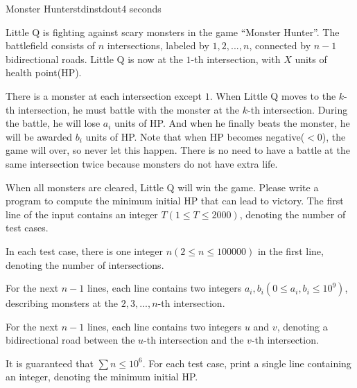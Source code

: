 \documentclass[11pt,a4paper,oneside]{article}
\newcommand{\timeLimit}{2 seconds}
\renewcommand{\defaultmemorylimit}{512 megabytes}
\begin{document}
\renewcommand{\timeLimit}{4 seconds}
\renewcommand{\defaultmemorylimit}{512 megabytes}
\begin{problem}{Monster Hunter}{stdin}{stdout}{\timeLimit}

Little Q is fighting against scary monsters in the game ``Monster Hunter''. The battlefield consists of $n$ intersections, labeled by $1,2,...,n$, connected by $n-1$ bidirectional roads. Little Q is now at the $1$-th intersection, with $X$ units of health point(HP).\par
There is a monster at each intersection except $1$. When Little Q moves to the $k$-th intersection, he must battle with the monster at the $k$-th intersection. During the battle, he will lose $a_i$ units of HP. And when he finally beats the monster, he will be awarded $b_i$ units of HP. Note that when HP becomes negative($<0$), the game will over, so never let this happen. There is no need to have a battle at the same intersection twice because monsters do not have extra life.\par
When all monsters are cleared, Little Q will win the game. Please write a program to compute the minimum initial HP that can lead to victory.
\InputFile
The first line of the input contains an integer $T(1\leq T\leq2000)$, denoting the number of test cases.\par
In each test case, there is one integer $n(2\leq n\leq 100000)$ in the first line, denoting the number of intersections.\par
For the next $n-1$ lines, each line contains two integers $a_i,b_i(0\leq a_i,b_i\leq 10^9)$, describing monsters at the $2,3,...,n$-th intersection.\par
For the next $n-1$ lines, each line contains two integers $u$ and $v$, denoting a bidirectional road between the $u$-th intersection and the $v$-th intersection.\par
It is guaranteed that $\sum n\leq 10^6$.
\OutputFile
For each test case, print a single line containing an integer, denoting the minimum initial HP.

\Examples
\begin{example}
%
\end{example}
\end{problem}
\renewcommand{\timeLimit}{1 second}
\renewcommand{\defaultmemorylimit}{512 megabytes}
\end{document}

